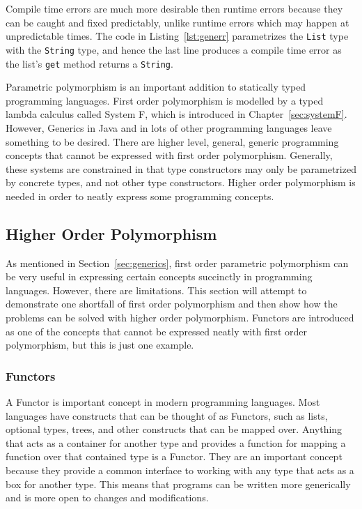 Compile time errors are much more desirable then runtime errors because they
can be caught and fixed predictably, unlike runtime errors which may happen at
unpredictable times. The code in Listing~\ref{lst:generr} parametrizes the
\lstinline{List} type with the \lstinline{String} type, and hence the last line
produces a compile time error as the list's \lstinline{get} method returns a
\lstinline{String}. 

Parametric polymorphism is an important addition to statically typed
programming languages. First order polymorphism is modelled by a typed lambda
calculus called System F, which is introduced in Chapter~\ref{sec:systemF}.
However, Generics in Java and in lots of other programming languages leave
something to be desired.  There are higher level, general, generic programming
concepts that cannot be expressed with first order polymorphism. Generally,
these systems are constrained in that type constructors may only be
parametrized by concrete types, and not other type constructors. Higher order
polymorphism is needed in order to neatly express some programming concepts.

\subsection{Higher Order Polymorphism}
As mentioned in Section~\ref{sec:generics}, first order parametric polymorphism
can be very useful in expressing certain concepts succinctly in programming 
languages. However, there are limitations. This section will attempt to 
demonstrate one shortfall of first order polymorphism and then show how the
problems can be solved with higher order polymorphism. Functors are introduced
as one of the concepts that cannot be expressed neatly with first order polymorphism,
but this is just one example.

\subsubsection{Functors}
A Functor is important concept in modern programming languages. Most languages
have constructs that can be thought of as Functors, such as lists, optional types,
trees, and other constructs that can be mapped over. Anything that acts as a
container for another type and provides a function for mapping a function over
that contained type is a Functor. They are an important concept because they
provide a common interface to working with any type that acts as a box for
another type. This means that programs can be written more generically and is
more open to changes and modifications.

